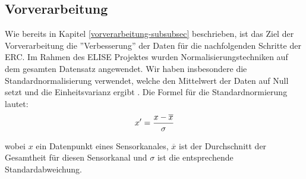 \subsection{Vorverarbeitung} \label{vorverarbeitung-1-subsec}

Wie bereits in Kapitel \ref{vorverarbeitung-subsubsec} beschrieben, ist das Ziel der Vorverarbeitung die ”Verbesserung” der Daten für die nachfolgenden Schritte der ERC.
Im Rahmen des ELISE Projektes wurden Normalisierungstechniken auf dem gesamten Datensatz angewendet. 
Wir haben insbesondere die Standardnormalisierung verwendet, welche den Mittelwert der Daten auf Null setzt und die Einheitsvarianz ergibt \cite{grus15}. 
Die Formel für die Standardnormierung lautet:
\begin{equation} 
\Large{ {x'={\frac {x-{\overline {x}}}{\sigma }}} } 
\label{equ:norm} \end{equation} %

wobei $ x $ ein Datenpunkt eines Sensorkanales, $ \overline{x} $ ist der Durchschnitt der Gesamtheit für diesen Sensorkanal und $ \sigma $ ist die entsprechende Standardabweichung. \\